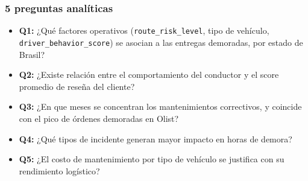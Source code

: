 \documentclass[aspectratio=169,11pt]{beamer}
\begin{document}

\begin{frame}

\frametitle{5 preguntas analíticas}

\begin{itemize}

\item \textbf{Q1:} ¿Qué factores operativos
(\texttt{route\_risk\_level}, tipo de vehículo,
\texttt{driver\_behavior\_score}) se asocian a las entregas
demoradas, por estado de Brasil?

\vspace{2mm}

\item \textbf{Q2:} ¿Existe relación entre el comportamiento
del conductor y el score promedio de reseña del cliente?

\vspace{2mm}

\item \textbf{Q3:} ¿En que meses se concentran los
mantenimientos correctivos, y coincide con el pico de
órdenes demoradas en Olist?

\vspace{2mm}

\item \textbf{Q4:} ¿Qué tipos de incidente generan mayor
impacto en horas de demora?

\vspace{2mm}

\item \textbf{Q5:} ¿El costo de mantenimiento por tipo
de vehículo se justifica con su rendimiento logístico?

\end{itemize}


\end{frame}
\end{document}

